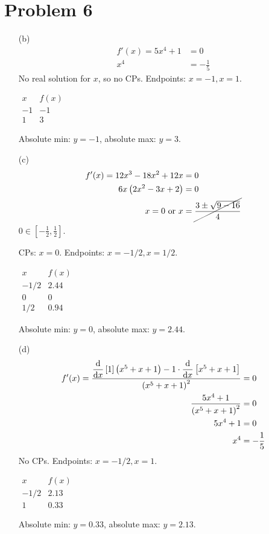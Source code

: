 \documentclass{article}
\newcommand*{\paren}[1]{\ensuremath\left(#1\right)}
\newcommand*{\problem}[1]{\section*{Problem #1}}
\newcommand*{\Deriv}[2][x]{\ensuremath{\dfrac{\mathrm{d}}{\mathrm{d}#1}\left[#2\right]}}
\begin{document}
\problem{6}
\begin{itemize}
	\item[(b)]
	\begin{align*}
		f'(x)=5x^4+1&=0 \\
		x^4&=-\frac{1}{5}
	\end{align*}
	No real solution for $x$, so no CPs. Endpoints: $x=-1,x=1$.
	\begin{center}
		$\begin{array}{c|c}
			x & f(x) \\
			\hline
			-1 & -1 \\
			1 & 3
		\end{array}$
	\end{center}
	Absolute min: $y=-1$, absolute max: $y=3$.

	\item[(c)]
	\begin{align*}
		f'(x)=12x^3-18x^2+12x&=0 \\
		6x\paren{2x^2-3x+2}&=0 \\
		x=0\text{ or }x&=\cancel{\frac{3\pm\sqrt{9-16}}{4}}
	\end{align*}
	$0\in\left[-\frac{1}{2},\frac{1}{2}\right]$.

	CPs: $x=0$. Endpoints: $x=-1/2,x=1/2$.
	\begin{center}
		$\begin{array}{c|c}
			x & f(x) \\
			\hline
			-1/2 & 2.44 \\
			0 & 0 \\
			1/2 & 0.94
		\end{array}$
	\end{center}
	Absolute min: $y=0$, absolute max: $y=2.44$.

	\item[(d)]
	\begin{align*}
		f'(x)=\frac{\Deriv{1}\paren{x^5+x+1}-1\cdot\Deriv{x^5+x+1}}{\paren{x^5+x+1}^2}&=0 \\
		\frac{5x^4+1}{\paren{x^5+x+1}^2}&=0 \\
		5x^4+1&=0 \\
		x^4&=-\frac{1}{5}
	\end{align*}
	No CPs. Endpoints: $x=-1/2,x=1$.
	\begin{center}
		$\begin{array}{c|c}
			x & f(x) \\
			\hline
			-1/2 & 2.13 \\
			1 & 0.33
		\end{array}$
	\end{center}
	Absolute min: $y=0.33$, absolute max: $y=2.13$.


\end{itemize}
\end{document}
